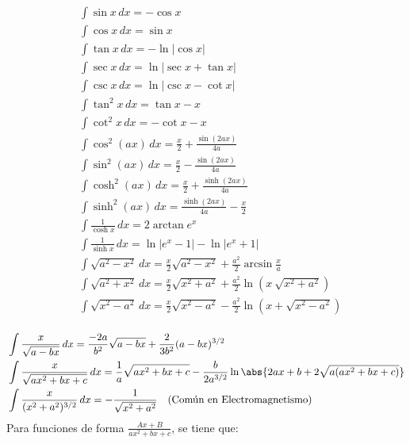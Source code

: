 \begin{minipage}{0.55\textwidth}
\begin{equation}
\begin{split}
    &\int \sin{x}\,dx = -\cos{x} \\
    &\int \cos{x}\,dx = \sin{x} \\
    &\int\tan{x}\,dx  = -\ln{|\cos{x}|} \\
    &\int\sec{x}\,dx  = \ln{|\sec{x}+\tan{x}|}\\
    &\int\csc{x}\,dx  = \ln{|\csc{x}-\cot{x}|}\\
    &\int\tan^2{x}\,dx  = \tan{x}-x \\
    &\int\cot^2{x}\,dx  = -\cot{x}-x \\
    &\int\cos^2{(ax)}\,dx  = \frac{x}{2}+\frac{\sin{(2ax)}}{4a}\\
    &\int\sin^2{(ax)}\,dx  = \frac{x}{2}-\frac{\sin{(2ax)}}{4a}\\
    &\int\cosh^2{(ax)}\,dx  = \frac{x}{2}+\frac{\sinh{(2ax)}}{4a}\\
    &\int\sinh^2{(ax)}\,dx  = \frac{\sinh{(2ax)}}{4a}-\frac{x}{2}\\
    &\int\frac{1}{\cosh{x}}\,dx  = 2\arctan{e^x}\\
    &\int\frac{1}{\sinh{x}}\,dx  = \ln{|e^x-1|}-\ln{|e^x+1|}\\
    &\int\sqrt{a^2-x^2}\,dx  = \frac{x}{2}\sqrt{a^2-x^2}+\frac{a^2}{2}\arcsin{\frac{x}{a}}\\
    &\int\sqrt{a^2+x^2}\,dx = \frac{x}{2}\sqrt{x^2+a^2}+\frac{a^2}{2}\ln{(x~\sqrt{x^2+a^2})}\\
    &\int\sqrt{x^2-a^2}\,dx = \frac{x}{2}\sqrt{x^2-a^2}-\frac{a^2}{2}\ln{(x+\sqrt{x^2-a^2})}\\
\end{split}
\nonumber
\end{equation}
\end{minipage}
\newpage
\begin{equation}
    \begin{split}
    &\int\frac{x}{\sqrt{a-bx}}\,dx= \frac{-2a}{b^2}\sqrt{a-bx}+\frac{2}{3b^2}(a-bx)^{3/2}\\
    &\int\frac{x}{\sqrt{ax^2 + bx +c}}\,dx = \frac{1}{a}\sqrt{ax^2 +bx +c} - \frac{b}{2a^{3/2}}\ln{\abs{2ax +b+2\sqrt{a(ax^2+bx+c)}}}\\
    &\int\frac{x}{(x^2+a^2)^{3/2}}\,dx = -\frac{1}{\sqrt{x^2 + a^2}} \quad \text{(Común en Electromagnetismo)}
    \end{split}
    \nonumber
\end{equation}
Para funciones de forma $\frac{Ax+B}{ax^2+bx+c}$, se tiene que:

